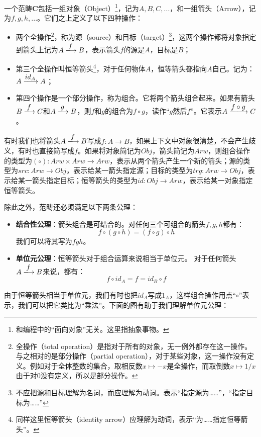 \documentclass{article}
\begin{document}
\begin{definition}
一个范畴$\pmb{C}$包括一组对象（Object）\footnote{和编程中的“面向对象”无关。这里指抽象事物。}，记为$A, B, C, ...$，和一组箭头（Arrow），记为$f, g, h, ...$。它们之上定义了以下四种操作：
\begin{itemize}
\item 两个全操作\footnote{全操作（total operation）是指对于所有的对象，无一例外都存在这一操作。与之相对的是部分操作（partial operation），对于某些对象，这一操作没有定义。例如对于全体整数的集合，取相反数$x \mapsto -x$是全操作，而取倒数$x \mapsto 1/x$由于对0没有定义，所以是部分操作。}，称为源（source）和目标（target）\footnote{不应把源和目标理解为名词，而应理解为动词。表示“指定源为……”，“指定目标为……”}，这两个操作都将对象指定到箭头上记为$A \arrowto{f} B$，表示箭头$f$的源是$A$，目标是$B$；
\item 第三个全操作叫恒等箭头\footnote{同样这里恒等箭头（identity arrow）应理解为动词，表示“为……指定恒等箭头”。}，对于任何物体$A$，恒等箭头都指向$A$自己。记为：$A \arrowto{id_A} A$；
\item 第四个操作是一个部分操作，称为组合。它将两个箭头组合起来。如果有箭头$B \arrowto{f} C$和$A \arrowto{g} B$，则$f$和$g$的组合为$f \circ g$，读作“$g$然后$f$”。它表示$A \arrowto{f \circ g} C$。
\end{itemize}

有时我们也将箭头$A \arrowto{f} B$写成$f: A \to B$，如果上下文中对象很清楚，不会产生歧义，有时也直接简写成$f$。如果将对象简记为$Obj$，箭头简记为$Arw$，则组合操作的类型为$(\circ) : Arw \times Arw \to Arw$，表示从两个箭头产生一个新的箭头；源的类型为$src: Arw \to Obj$，表示给某一箭头指定源；目标的类型为$trg: Arw \to Obj$，表示给某一箭头指定目标；恒等箭头的类型为$id: Obj \to Arw$，表示给某一对象指定恒等箭头。

除此之外，范畴还必须满足以下两条公理：

\begin{itemize}
\item \textbf{结合性公理}：箭头组合是可结合的。对任何三个可组合的箭头$f, g, h$都有：
\[
f \circ (g \circ h) = (f \circ g) \circ h
\]
我们可以将其写为$f g h$。
\item \textbf{单位元公理}：恒等箭头对于组合运算来说相当于单位元。
对于任何箭头$A \arrowto{f} B$来说，都有：
\[
f \circ id_A = f = id_B \circ f
\]
\end{itemize}
\end{definition}

由于恒等箭头相当于单位元，我们有时也把$id_A$写成$1_A$，这样组合操作用点“$\circ$”表示，我们可以把它类比为“乘法”。下面的图有助于我们理解单位元公理：
\end{document}
